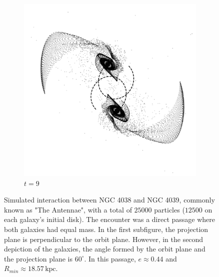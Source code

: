 \documentclass[11pt,twocolumn]{article}
\newcommand{\unit}[1]{\ensuremath{\, \mathrm{#1}}}
\begin{document}
\begin{figure}[!tbp]
            
            \begin{subfigure}[b]{0.9\textwidth}
            \includegraphics[width=\textwidth, trim={0 3cm 0 3cm}, clip]{Antennae/Ant_9_000000_140_tra.pdf}
    			\caption{$t = 9$} 
  			\end{subfigure}%
            
            
            
            \caption{Simulated interaction between NGC 4038 and NGC 4039, commonly known as "The Antennae", with a total of $25000$ particles ($12500$ on each galaxy's initial disk). The encounter was a direct passage where both galaxies had equal mass. In the first subfigure, the projection plane is perpendicular to the orbit plane. However, in the second depiction of the galaxies, the angle formed by the orbit plane and the projection plane is $60^{\circ}$. In this passage, $e \approx 0.44$ and $R_{min} \approx 18.57 \unit{kpc}$.}
            
            
            \label{fig:antennae}
		\end{figure}
        
\end{document}
